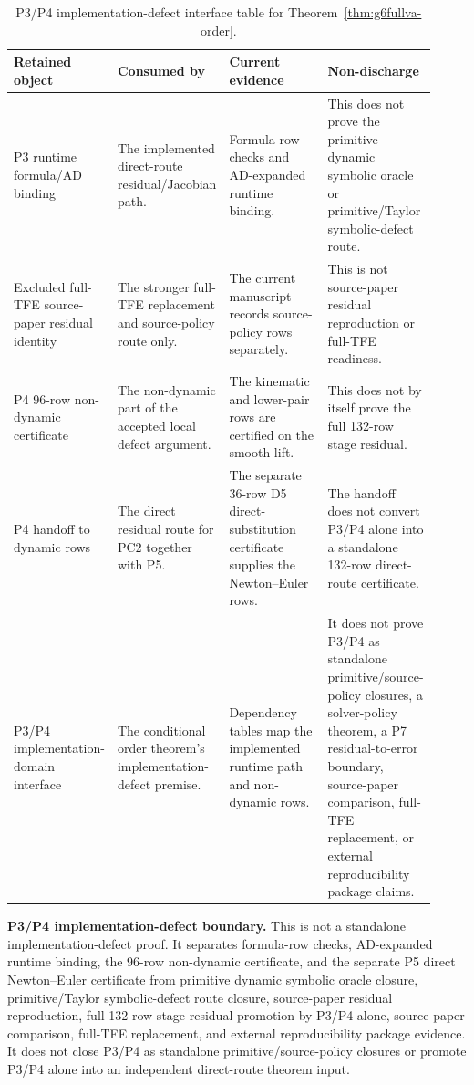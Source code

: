 \documentclass[preprint,12pt]{elsarticle}
\newcommand{\tfe}{TFE}
\begin{document}
\begin{table}[htbp]
\centering
\caption{P3/P4 implementation-defect interface table for
Theorem~\ref{thm:g6fullva-order}.}
\label{tab:p3p4-implementation-defect-obligation-ledger}
\scriptsize
\setlength{\tabcolsep}{2pt}
\renewcommand{\arraystretch}{0.9}
\begin{tabular}{P{0.18\linewidth}P{0.26\linewidth}P{0.25\linewidth}P{0.23\linewidth}}
\toprule
Retained object & Consumed by & Current evidence & Non-discharge \\
\midrule
P3 runtime formula/AD binding &
The implemented direct-route residual/Jacobian path. &
Formula-row checks and AD-expanded runtime binding. &
This does not prove the primitive dynamic symbolic oracle or primitive/Taylor
symbolic-defect route. \\
Excluded full-\tfe{} source-paper residual identity &
The stronger full-\tfe{} replacement and source-policy route only. &
The current manuscript records source-policy rows separately. &
This is not source-paper residual reproduction or full-\tfe{} readiness. \\
P4 96-row non-dynamic certificate &
The non-dynamic part of the accepted local defect argument. &
The kinematic and lower-pair rows are certified on the smooth lift. &
This does not by itself prove the full 132-row stage residual. \\
P4 handoff to dynamic rows &
The direct residual route for PC2 together with P5. &
The separate 36-row D5 direct-substitution certificate supplies the
Newton--Euler rows. &
The handoff does not convert P3/P4 alone into a standalone 132-row
direct-route certificate. \\
P3/P4 implementation-domain interface &
The conditional order theorem's implementation-defect premise. &
Dependency tables map the implemented runtime path and non-dynamic rows. &
It does not prove P3/P4 as standalone primitive/source-policy closures,
a solver-policy theorem, a P7 residual-to-error boundary,
source-paper comparison, full-\tfe{} replacement, or external
reproducibility package claims. \\
\bottomrule
\end{tabular}
\end{table}

\noindent\textbf{P3/P4 implementation-defect boundary.}
This is not a standalone
implementation-defect proof. It separates formula-row checks, AD-expanded runtime binding, the
96-row non-dynamic certificate, and the separate P5 direct Newton--Euler
certificate from primitive dynamic symbolic oracle closure,
primitive/Taylor symbolic-defect route closure, source-paper residual
reproduction, full 132-row stage residual promotion by P3/P4 alone,
source-paper comparison, full-\tfe{} replacement, and external
reproducibility package evidence. It
does not close P3/P4 as standalone primitive/source-policy closures or promote
P3/P4 alone into an independent direct-route theorem input.
\end{document}
